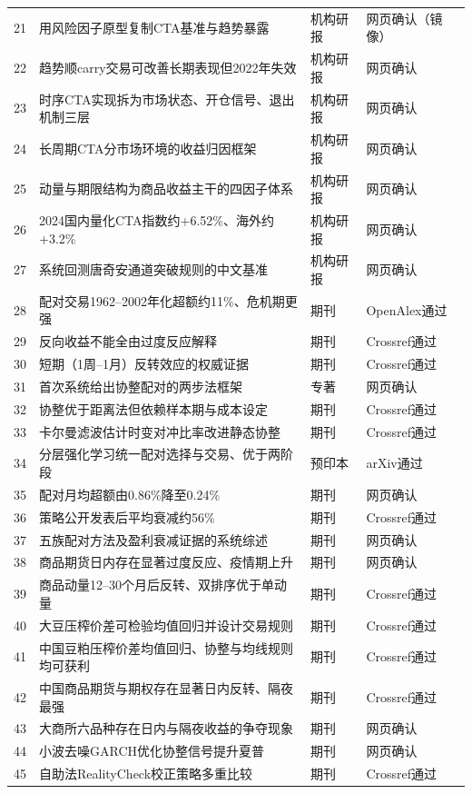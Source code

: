 \documentclass[12pt,a4paper]{ctexart}
\begin{document}
{\begin{longtable}{p{28.45pt}p{244.69pt}p{48.37pt}p{85.36pt}}
21 & 用风险因子原型复制CTA基准与趋势暴露 & 机构研报 & 网页确认（镜像） \\
22 & 趋势顺carry交易可改善长期表现但2022年失效 & 机构研报 & 网页确认 \\
23 & 时序CTA实现拆为市场状态、开仓信号、退出机制三层 & 机构研报 & 网页确认 \\
24 & 长周期CTA分市场环境的收益归因框架 & 机构研报 & 网页确认 \\
25 & 动量与期限结构为商品收益主干的四因子体系 & 机构研报 & 网页确认 \\
26 & 2024国内量化CTA指数约+6.52\%、海外约+3.2\% & 机构研报 & 网页确认 \\
27 & 系统回测唐奇安通道突破规则的中文基准 & 机构研报 & 网页确认 \\
28 & 配对交易1962–2002年化超额约11\%、危机期更强 & 期刊 & OpenAlex通过 \\
29 & 反向收益不能全由过度反应解释 & 期刊 & Crossref通过 \\
30 & 短期（1周–1月）反转效应的权威证据 & 期刊 & Crossref通过 \\
31 & 首次系统给出协整配对的两步法框架 & 专著 & 网页确认 \\
32 & 协整优于距离法但依赖样本期与成本设定 & 期刊 & Crossref通过 \\
33 & 卡尔曼滤波估计时变对冲比率改进静态协整 & 期刊 & Crossref通过 \\
34 & 分层强化学习统一配对选择与交易、优于两阶段 & 预印本 & arXiv通过 \\
35 & 配对月均超额由0.86\%降至0.24\% & 期刊 & 网页确认 \\
36 & 策略公开发表后平均衰减约56\% & 期刊 & Crossref通过 \\
37 & 五族配对方法及盈利衰减证据的系统综述 & 期刊 & 网页确认 \\
38 & 商品期货日内存在显著过度反应、疫情期上升 & 期刊 & 网页确认 \\
39 & 商品动量12–30个月后反转、双排序优于单动量 & 期刊 & Crossref通过 \\
40 & 大豆压榨价差可检验均值回归并设计交易规则 & 期刊 & Crossref通过 \\
41 & 中国豆粕压榨价差均值回归、协整与均线规则均可获利 & 期刊 & Crossref通过 \\
42 & 中国商品期货与期权存在显著日内反转、隔夜最强 & 期刊 & Crossref通过 \\
43 & 大商所六品种存在日内与隔夜收益的争夺现象 & 期刊 & 网页确认 \\
44 & 小波去噪GARCH优化协整信号提升夏普 & 期刊 & 网页确认 \\
45 & 自助法RealityCheck校正策略多重比较 & 期刊 & Crossref通过 \\

\end{longtable}}
\end{document}
